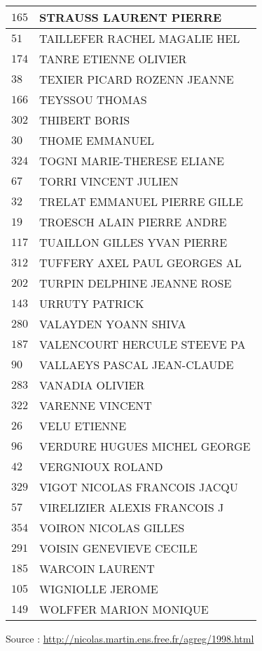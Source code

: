 \begin{xltabular}{\linewidth}{|l|X|}
    \hline
    $165$ & STRAUSS LAURENT PIERRE \\
    \hline
    $51$ & TAILLEFER RACHEL MAGALIE HEL \\
    \hline
    $174$ & TANRE ETIENNE OLIVIER \\
    \hline
    $38$ & TEXIER PICARD ROZENN JEANNE \\
    \hline
    $166$ & TEYSSOU THOMAS \\
    \hline
    $302$ & THIBERT BORIS \\
    \hline
    $30$ & THOME EMMANUEL \\
    \hline
    $324$ & TOGNI MARIE-THERESE ELIANE \\
    \hline
    $67$ & TORRI VINCENT JULIEN \\
    \hline
    $32$ & TRELAT EMMANUEL PIERRE GILLE \\
    \hline
    $19$ & TROESCH ALAIN PIERRE ANDRE \\
    \hline
    $117$ & TUAILLON GILLES YVAN PIERRE \\
    \hline
    $312$ & TUFFERY AXEL PAUL GEORGES AL \\
    \hline
    $202$ & TURPIN DELPHINE JEANNE ROSE \\
    \hline
    $143$ & URRUTY PATRICK \\
    \hline
    $280$ & VALAYDEN YOANN SHIVA \\
    \hline
    $187$ & VALENCOURT HERCULE STEEVE PA \\
    \hline
    $90$ & VALLAEYS PASCAL JEAN-CLAUDE \\
    \hline
    $283$ & VANADIA OLIVIER \\
    \hline
    $322$ & VARENNE VINCENT \\
    \hline
    $26$ & VELU ETIENNE \\
    \hline
    $96$ & VERDURE HUGUES MICHEL GEORGE \\
    \hline
    $42$ & VERGNIOUX ROLAND \\
    \hline
    $329$ & VIGOT NICOLAS FRANCOIS JACQU \\
    \hline
    $57$ & VIRELIZIER ALEXIS FRANCOIS J \\
    \hline
    $354$ & VOIRON NICOLAS GILLES \\
    \hline
    $291$ & VOISIN GENEVIEVE CECILE \\
    \hline
    $185$ & WARCOIN LAURENT \\
    \hline
    $105$ & WIGNIOLLE JEROME \\
    \hline
    $149$ & WOLFFER MARION MONIQUE \\
    \hline
  \end{xltabular}

  \begin{flushright}
    {\tiny Source : \url{http://nicolas.martin.ens.free.fr/agreg/1998.html}}
  \end{flushright}

